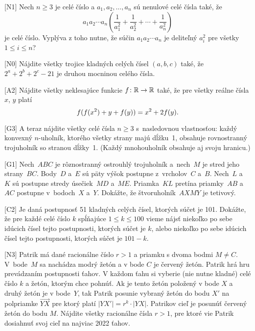 {%
[N1]
Nech $n\ge 3$ je celé číslo a $a_1,a_2,\dots,a_n$ sú nenulové celé čísla také, že
$$
a_1a_2\cdots a_n \left( \frac{1}{a_1^2}+\frac{1}{a_2^2}+\cdots+ \frac{1}{a_n^2}\right)
$$
je celé číslo. Vyplýva z toho nutne, že súčin $a_1a_2\cdots a_n$ je deliteľný $a_i^2$ pre všetky $1\le i\le n$?}

{%
[N0]
Nájdite všetky trojice kladných celých čísel $(a,b,c)$ také, že $2^a+2^b+2^c-21$ je druhou mocninou celého čísla.}

{%
[A2]
Nájdite všetky neklesajúce funkcie $f\colon\Bbb R\rightarrow\Bbb R$ také, že pre všetky reálne čísla $x$, $y$ platí
$$
f(f(x^2)+y+f(y))=x^2+2f(y).
\belowdisplayskip0pt
$$}

{%
[G3]
A teraz nájdite všetky celé čísla $n \ge 3$ s~nasledovnou vlastnosťou: každý konvexný $n$-uholník, ktorého všetky strany majú dĺžku~1, obsahuje rovnostranný trojuholník so stranou dĺžky~1. (Každý mnohouholník obsahuje aj svoju hranicu.)}

{%
[G1]
Nech~$ABC$ je rôznostranný ostrouhlý trojuholník a~nech~$M$ je stred jeho strany~$BC$. Body~$D$ a~$E$ sú päty výšok postupne z~vrcholov~$C$ a~$B$. Nech~$L$ a~$K$ sú postupne stredy úsečiek~$MD$ a~$ME$. Priamka~$KL$ pretína priamky~$AB$ a~$AC$ postupne v~bodoch~$X$ a~$Y$. Dokážte, že štvoruholník~$AXMY$ je tetivový.}

{%
[C2]
Je daná postupnosť 51 kladných celých čísel, ktorých súčet je 101. Dokážte, že pre každé celé číslo $k$ spĺňajúce $1\le k\le 100$ vieme nájsť niekoľko po sebe idúcich čísel tejto postupnosti, ktorých súčet je $k$, alebo niekoľko po sebe idúcich čísel tejto postupnosti, ktorých súčet je $101-k$.}

{%
[N3]
Patrik má dané racionálne číslo $r>1$ a priamku s dvoma bodmi $M\ne C$. V~bode~$M$ sa nachádza modrý žetón a v bode $C$ je červený žetón. Patrik hrá hru prevádzaním postupnosti ťahov. V každom ťahu si vyberie (nie nutne kladné) celé číslo $k$ a žetón, ktorým chce pohnúť. Ak je tento žetón položený v bode $X$ a druhý žetón je v bode~$Y$, tak Patrik posunie vybraný žetón do bodu $X'$ na polpriamke $\overrightarrow{YX}$ pre ktorý platí $|YX'|=r^k \cdot |YX|$.
Patrikov cieľ je posunúť červený žetón do bodu $M$. Nájdite všetky racionálne čísla $r>1$, pre ktoré vie Patrik dosiahnuť svoj cieľ na najviac 2022 ťahov.}


